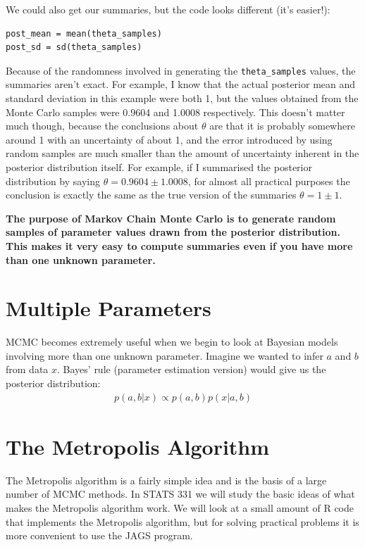 We could also get our summaries, but the code looks different (it's easier!):
\begin{verbatim}
post_mean = mean(theta_samples)
post_sd = sd(theta_samples)
\end{verbatim}
Because of the randomness involved in generating the {\tt theta\_samples} values,
the summaries aren't exact. For example, I know that the actual posterior mean
and standard deviation in this example were both 1, but the values obtained
from the Monte Carlo samples were 0.9604 and 1.0008 respectively. This doesn't
matter much though, because the conclusions about $\theta$ are that it is probably
somewhere around 1 with an uncertainty of about 1, and the error introduced by
using random samples are much smaller than the amount of uncertainty inherent
in the posterior distribution itself. For example, if I summarised the posterior
distribution by saying $\theta = 0.9604 \pm 1.0008$, for almost all practical
purposes the conclusion is exactly the same as the true version of the summaries
$\theta = 1 \pm 1$.

\begin{framed}
{\bf
The purpose of Markov Chain Monte Carlo is to generate random samples of
parameter values drawn from the posterior distribution. This makes it very easy
to compute summaries even if you have more than one unknown parameter.}
\end{framed}

\section{Multiple Parameters}
MCMC becomes extremely useful when we begin to look at Bayesian models involving
more than one unknown parameter. Imagine we wanted to infer $a$ and $b$ from
data $x$. Bayes' rule (parameter estimation version) would give us the posterior
distribution:
\begin{eqnarray}
p(a, b | x) \propto p(a, b)p(x|a,b)
\end{eqnarray}


\section{The Metropolis Algorithm}
The Metropolis algorithm is a fairly simple idea and is the basis of a large
number of MCMC methods. In STATS 331 we will study the basic ideas of what
makes the Metropolis algorithm work. We will look at a small amount of R code
that implements the Metropolis algorithm, but for solving practical problems
it is more convenient to use the JAGS program.

